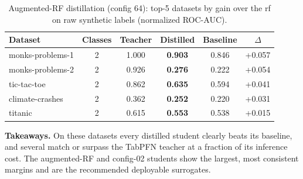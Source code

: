 \documentclass[10pt]{article}
\begin{document}
\begin{table}[!ht]
\centering\small
\caption{Augmented-RF distillation (config 64): top-5 datasets by gain over the rf on raw synthetic labels (normalized ROC-AUC).}
\label{tab:rf_aug}
\begin{tabular}{lccccc}
\toprule
Dataset & Classes & Teacher & Distilled & Baseline & $\Delta$ \\
\midrule
monks-problems-1 & 2 & 1.000 & \textbf{0.903} & 0.846 & +0.057 \\
monks-problems-2 & 2 & 0.926 & \textbf{0.276} & 0.222 & +0.054 \\
tic-tac-toe & 2 & 0.862 & \textbf{0.635} & 0.594 & +0.041 \\
climate-crashes & 2 & 0.362 & \textbf{0.252} & 0.220 & +0.031 \\
titanic & 2 & 0.615 & \textbf{0.553} & 0.538 & +0.015 \\
\bottomrule
\end{tabular}
\end{table}

\noindent\textbf{Takeaways.} On these datasets every distilled student clearly beats its baseline,
and several match or surpass the TabPFN teacher at a fraction of its inference cost. The
augmented-RF and config-02 students show the largest, most consistent margins and are the
recommended deployable surrogates.
\end{document}
